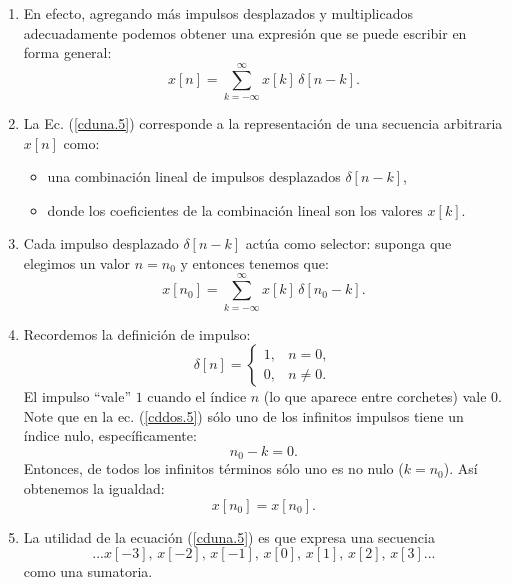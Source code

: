 \documentclass[11pt,a4paper,openany]{book}
\begin{document}
\begin{enumerate}
	\item En efecto, agregando más impulsos desplazados y multiplicados adecuadamente podemos obtener una expresión que se puede escribir en forma general:
	\begin{equation}
		x[n] = \sum_{k=-\infty}^{\infty} x[k] \, \delta[n-k].
		\label{cduna.5}
	\end{equation}
	
	\item La Ec. (\ref{cduna.5}) corresponde a la representación de una secuencia arbitraria $x[n]$ como:
	\begin{itemize}
		\item una combinación lineal de impulsos desplazados $\delta[n-k]$,
		\item donde los coeficientes de la combinación lineal son los valores $x[k]$.
	\end{itemize}
	
	\item Cada impulso desplazado $\delta[n-k]$ actúa como selector: suponga que elegimos un valor $n=n_{0}$ y entonces tenemos que:
	\begin{equation}
		x[n_{0}] = \sum_{k=-\infty}^{\infty} x[k] \, \delta[n_{0}-k].
		\label{cddos.5}
	\end{equation}
	
	\item Recordemos la definición de impulso:
	\begin{equation}
		\delta[n] = \begin{cases}
			1, & n=0, \\ 
			0, & n\neq 0.
		\end{cases}
	\end{equation}
	El impulso ``vale'' $1$ cuando el índice $n$ (lo que aparece entre corchetes) vale $0$. Note que en la ec. (\ref{cddos.5}) sólo uno de los infinitos impulsos tiene un índice nulo, específicamente:
	\begin{equation}
		n_{0}-k=0.
	\end{equation}
	Entonces, de todos los infinitos términos sólo uno es no nulo ($k=n_{0}$). Así obtenemos la igualdad:
	\begin{equation}
		x[n_{0}] = x[n_{0}].
	\end{equation}
	
	\item La utilidad de la ecuación (\ref{cduna.5}) es que expresa una secuencia
	\begin{equation}
		...x[-3], \, x[-2], \, x[-1], \, x[0], \, x[1], \, x[2], \, x[3]...
	\end{equation}
	como una sumatoria.
\end{enumerate}
\end{document}
